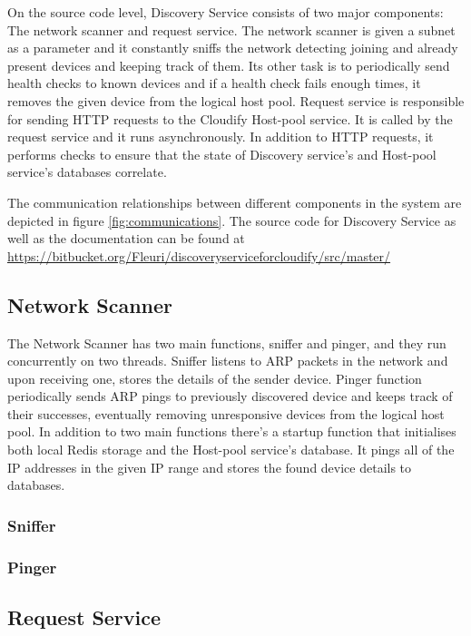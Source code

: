 On the source code level, Discovery Service consists of two major components: The network scanner and request service. The network scanner is given a subnet as a parameter and it constantly sniffs the network detecting joining and already present devices and keeping track of them. Its other task is to periodically send health checks to known devices and if a health check fails enough times, it removes the given device from the logical host pool. Request service is responsible for sending HTTP requests to the Cloudify Host-pool service. It is called by the request service and it runs asynchronously. In addition to HTTP requests, it performs checks to ensure that the state of Discovery service's and Host-pool service's databases correlate.

The communication relationships between different components in the system are depicted in figure \ref{fig:communications}. The source code for Discovery Service as well as the documentation can be found at \url{https://bitbucket.org/Fleuri/discoveryserviceforcloudify/src/master/}

\subsection{Network Scanner}

The Network Scanner has two main functions, sniffer and pinger, and they run concurrently on two threads. Sniffer listens to ARP packets in the network and upon receiving one, stores the details of the sender device. Pinger function periodically sends ARP pings to previously discovered device and keeps track of their successes, eventually removing unresponsive devices from the logical host pool. In addition to two main functions there's a startup function that initialises both local Redis storage and the Host-pool service's database. It pings all of the IP addresses in the given IP range and stores the found device details to databases.

\subsubsection{Sniffer}

\subsubsection{Pinger}

\subsection{Request Service}


